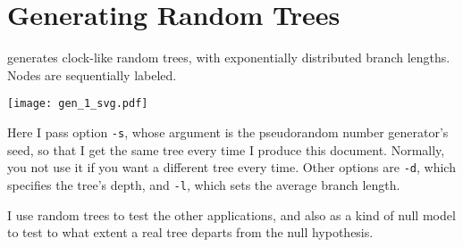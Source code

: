 \section{Generating Random Trees}
\label{sct_gen}

\gen{} generates clock-like random trees, with exponentially distributed branch
lengths. Nodes are sequentially labeled.


\begin{center}
\texttt{[image: gen\_1\_svg.pdf]}
\end{center}

\noindent{}Here I pass option \texttt{-s}, whose argument is the pseudorandom
number generator's seed, so that I get the same tree every time I produce this
document. Normally, you not use it if you want a different tree every time.
Other options are \texttt{-d}, which specifies the tree's depth, and
\texttt{-l}, which sets the average branch length.

I use random trees to test the other applications, and also as a kind of null
model to test to what extent a real tree departs from the null hypothesis.
